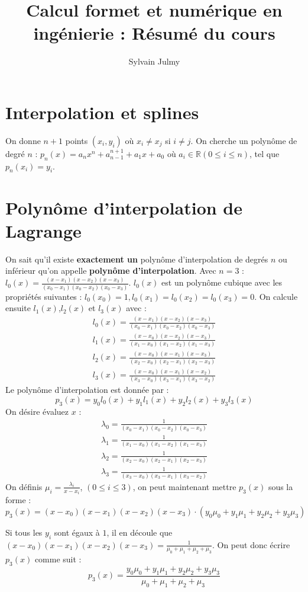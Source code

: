 \documentclass[a4paper,9pt]{extarticle}
\author{Sylvain Julmy}
\title{Calcul formet et numérique en ingénierie : Résumé du cours}
\begin{document}
\begin{multicols*}{2}

\section{Interpolation et splines}

On donne $n+1$ points $(x_i,y_i)$ où $x_i\neq x_j$ si $i\neq j$. On cherche un polynôme de degré $n$ : $p_n(x)=a_nx^n+a_{n-1}^{n+1}+a_1x+a_0$ où $a_i\in \mathbb{R}(0 \leq i \leq n)$, tel que $p_n(x_i)=y_i$.

\section{Polynôme d'interpolation de Lagrange}

On sait qu'il existe \textbf{exactement un} polynôme d'interpolation de degrés $n$ ou inférieur qu'on appelle \textbf{polynôme d'interpolation}. Avec $n=3$ :
$l_0(x)=\frac{(x-x_1)(x-x_2)(x-x_3)}{(x_0-x_1)(x_0-x_2)(x_0-x_3)}$. $l_0(x)$ est un polynôme cubique avec les propriétés suivantes : $l_0(x_0)=1,l_0(x_1)=l_0(x_2)=l_0(x_3)=0$. On calcule ensuite $l_1(x)$,$l_2(x)$ et $l_3(x)$ avec :
\begin{align*}
l_0(x)=\frac{(x-x_1)(x-x_2)(x-x_3)}{(x_0-x_1)(x_0-x_2)(x_0-x_3)} \\
l_1(x)=\frac{(x-x_0)(x-x_2)(x-x_3)}{(x_1-x_0)(x_1-x_2)(x_1-x_3)} \\
l_2(x)=\frac{(x-x_0)(x-x_1)(x-x_3)}{(x_2-x_0)(x_2-x_1)(x_2-x_3)} \\
l_3(x)=\frac{(x-x_0)(x-x_1)(x-x_2)}{(x_3-x_0)(x_3-x_1)(x_3-x_2)}
\end{align*}
Le polynôme d'interpolation est donnée par :
$$
p_3(x) = y_0l_0(x)+y_1l_1(x)+y_2l_2(x)+y_3l_3(x)
$$
On désire évaluez $x$ :
\begin{align*}
\lambda_0 = \frac{1}{(x_0-x_1)(x_0-x_2)(x_0-x_3)} \\
\lambda_1 = \frac{1}{(x_1-x_0)(x_1-x_2)(x_1-x_3)} \\
\lambda_2 = \frac{1}{(x_2-x_0)(x_2-x_1)(x_2-x_3)} \\
\lambda_3 = \frac{1}{(x_3-x_0)(x_3-x_1)(x_3-x_2)}
\end{align*}
On définis $\mu_i=\frac{\lambda_i}{x-x_i}$, $(0\leq i \leq 3)$, on peut maintenant mettre $p_3(x)$ sous la forme :
$$
p_3(x)=(x-x_0)(x-x_1)(x-x_2)(x-x_3)\cdot (y_0\mu_0+y_1\mu_1+y_2\mu_2+y_3\mu_3)
$$

Si tous les $y_i$ sont égaux à $1$, il en découle que $(x-x_0)(x-x_1)(x-x_2)(x-x_3)=\frac{1}{\mu_0+\mu_1+\mu_2+\mu_3}$. On peut donc écrire $p_3(x)$ comme suit :
$$
p_3(x) = \frac{y_0\mu_0+y_1\mu_1+y_2\mu_2+y_3\mu_3}{\mu_0+\mu_1+\mu_2+\mu_3}
$$


\end{multicols*}
\end{document}
